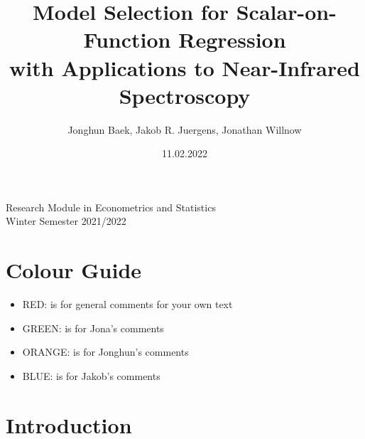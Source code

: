 \documentclass[11pt,twoside,a4paper]{article}
\begin{document}
	\title{{\LARGE Model Selection for Scalar-on-Function Regression \\ with Applications to Near-Infrared Spectroscopy}}
	\author{Jonghun Baek, Jakob R. Juergens, Jonathan Willnow}
	\date{11.02.2022}
	\maketitle
	\vspace{1.5 cm}
	\begin{center}
		Research Module in Econometrics and Statistics \\
		Winter Semester 2021/2022
	\end{center}
	
	\newpage
	
	\tableofcontents
	
	\newpage
	
	\section{Colour Guide}
		\begin{itemize}
			\item {\color{red} RED}: is for general comments for your own text
			\item {\color{green} GREEN}: is for Jona's comments
			\item {\color{orange} ORANGE}: is for Jonghun's comments
			\item {\color{blue} BLUE}: is for Jakob's comments
		\end{itemize}
	
	\section{Introduction}
	
\end{document}
